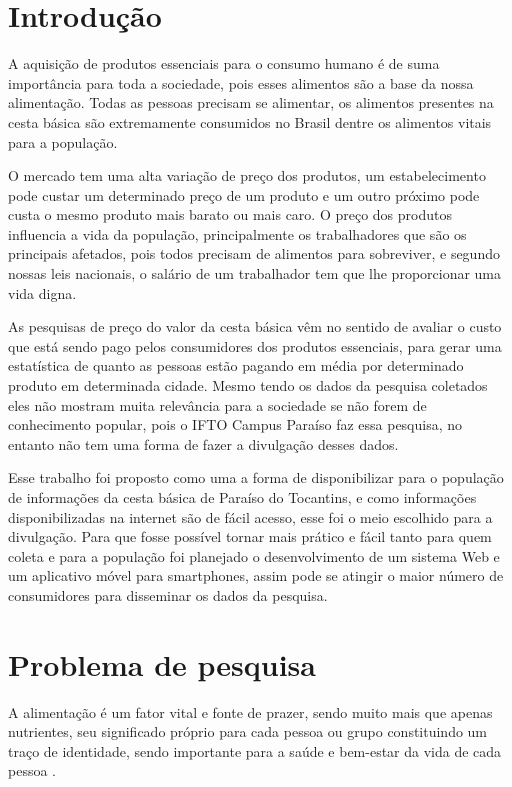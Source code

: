 \documentclass{ifto-tex}
\begin{document}
\textual

\chapter{Introdução}

A aquisição de produtos essenciais para o consumo humano é de suma importância para toda a sociedade, pois esses alimentos são a base da nossa alimentação. Todas as pessoas precisam se alimentar, os alimentos presentes na cesta básica são extremamente consumidos no Brasil dentre os alimentos vitais para a população.

O mercado tem uma alta variação de preço dos produtos, um estabelecimento pode custar um determinado preço de um produto e um outro próximo pode custa o mesmo produto mais barato ou mais caro. O preço dos produtos influencia a vida da população, principalmente os trabalhadores que são os principais afetados, pois todos precisam de alimentos para sobreviver, e segundo nossas leis nacionais, o salário de um trabalhador tem que lhe proporcionar uma vida digna.

As pesquisas de preço do valor da cesta básica vêm no sentido de avaliar o custo que está sendo pago pelos consumidores dos produtos essenciais, para gerar uma estatística de quanto as pessoas estão pagando em média por determinado produto em determinada cidade. Mesmo tendo os dados da pesquisa coletados eles não mostram muita relevância para a sociedade se não forem de conhecimento popular, pois o IFTO Campus Paraíso faz essa pesquisa, no entanto não tem uma forma de fazer a divulgação desses dados.

Esse trabalho foi proposto como uma a forma de disponibilizar para o população de informações da cesta básica de Paraíso do Tocantins, e como informações disponibilizadas na internet são de fácil acesso, esse foi o meio escolhido para a divulgação. Para que fosse possível tornar mais prático e fácil tanto para quem coleta e para a população foi planejado o desenvolvimento de um sistema Web e um aplicativo móvel para smartphones, assim pode se atingir o maior número de consumidores para disseminar os dados da pesquisa.

	
	

\chapter{Problema de pesquisa}
	
		A alimentação é um fator vital e fonte de prazer, sendo muito mais que apenas nutrientes, seu significado próprio para cada pessoa ou grupo constituindo um traço de identidade, sendo importante para a saúde e bem-estar da vida de cada pessoa \cite{loureiro2004importancia}.
		
\end{document}
